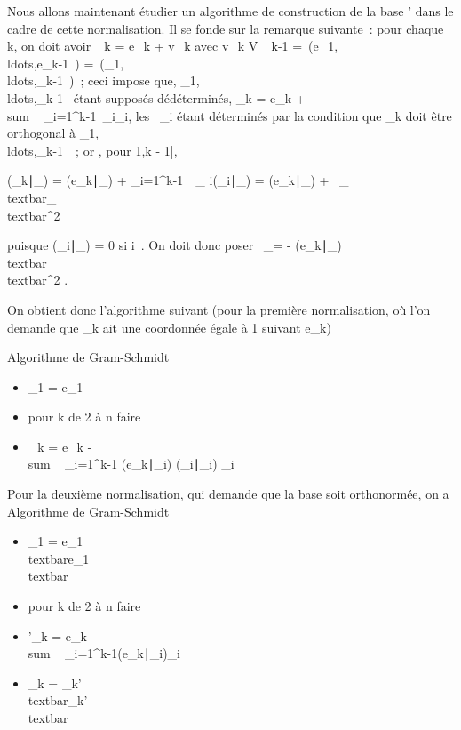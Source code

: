\documentclass[]{article}
\begin{document}
Nous allons maintenant étudier un algorithme de construction de la base
' dans le cadre de cette normalisation. Il se fonde sur la remarque
suivante~: pour chaque k, on doit avoir \epsilon\_k = e\_k +
v\_k avec v\_k \in V \_k-1
=\
\mathrmVect(e\_1,\\ldots,e\_k-1~)
=\
\mathrmVect(\epsilon\_1,\\ldots,\epsilon\_k-1~)~;
ceci impose que,
\epsilon\_1,\\ldots,\epsilon\_k-1~
étant supposés dé déterminés, \epsilon\_k = e\_k
+ \\sum ~
\_i=1^k-1\alpha~\_i\epsilon\_i, les \alpha~\_i étant
déterminés par la condition que \epsilon\_k doit être orthogonal à
\epsilon\_1,\\ldots,\epsilon\_k-1~~;
or , pour \jmath \in {[}1,k - 1{]},

(\epsilon\_k∣\epsilon\_\jmath) =
(e\_k∣\epsilon\_\jmath) +
\sum \_i=1^k-1\alpha~~\_
i(\epsilon\_i∣\epsilon\_\jmath) =
(e\_k∣\epsilon\_\jmath) +
\alpha~\_\jmath\\textbar{}\epsilon\_\jmath\\textbar{}^2

puisque (\epsilon\_i∣\epsilon\_\jmath) = 0 si
i\neq~\jmath. On doit donc poser \alpha~\_\jmath = -
(e\_k∣\epsilon\_\jmath)
\over
\\textbar{}\epsilon\_\jmath\\textbar{}^2
.

On obtient donc l'algorithme suivant (pour la première normalisation, où
l'on demande que \epsilon\_k ait une coordonnée égale à 1 suivant
e\_k)

Algorithme de Gram-Schmidt

\begin{itemize}
\itemsep1pt\parskip0pt
\item
  \epsilon\_1 = e\_1
\item
  pour k de 2 à n faire
\item
  \quad \quad \epsilon\_k = e\_k
  -\\sum ~
  \_i=1^k-1
  (e\_k∣\epsilon\_i)
  \over
  (\epsilon\_i∣\epsilon\_i) \epsilon\_i
\end{itemize}

Pour la deuxième normalisation, qui demande que la base soit
orthonormée, on a Algorithme de Gram-Schmidt

\begin{itemize}
\itemsep1pt\parskip0pt
\item
  \epsilon\_1 = e\_1\over
  \\textbar{}e\_1\\textbar{}
\item
  pour k de 2 à n faire
\item
  \quad \quad \epsilon'\_k = e\_k
  -\\sum ~
  \_i=1^k-1(e\_k∣\epsilon\_i)\epsilon\_i
\item
  \quad \quad \epsilon\_k =
  \epsilon\_k'\over
  \\textbar{}\epsilon\_k'\\textbar{}
\end{itemize}
\end{document}

